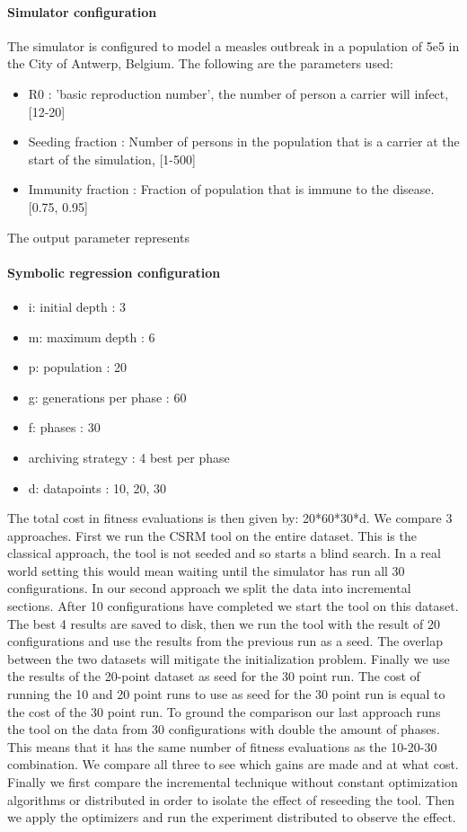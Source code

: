 \paragraph{Simulator configuration}
The simulator is configured to model a measles outbreak in a population of 5e5 in the City of Antwerp, Belgium. %
The following are the parameters used:
\begin{itemize}
\item R0 : 'basic reproduction number', the number of person a carrier will infect, [12-20]
\item Seeding fraction : Number of persons in the population that is a carrier at the start of the simulation, [1-500]
\item Immunity fraction : Fraction of population that is immune to the disease. [0.75, 0.95]
\end{itemize}
The output parameter represents 
\paragraph{Symbolic regression configuration}
\begin{itemize}
\item i: initial depth : 3
\item m: maximum depth : 6
\item p: population : 20
\item g: generations per phase : 60
\item f: phases : 30
\item archiving strategy : 4 best per phase
\item d: datapoints : 10, 20, 30
\end{itemize}
The total cost in fitness evaluations is then given by: 20*60*30*d.
We compare 3 approaches. First we run the CSRM tool on the entire dataset. This is the classical approach, the tool is not seeded and so starts a blind search. In a real world setting this would mean waiting until the simulator has run all 30 configurations.
In our second approach we split the data into incremental sections. After 10 configurations have completed we start the tool on this dataset. 
The best 4 results are saved to disk, then we run the tool with the result of 20 configurations and use the results from the previous run as a seed. The overlap between the two datasets will mitigate the initialization problem. Finally we use the results of the 20-point dataset as seed for the 30 point run. 
The cost of running the 10 and 20 point runs to use as seed for the 30 point run is equal to the cost of the 30 point run. 
To ground the comparison our last approach runs the tool on the data from 30 configurations with double the amount of phases. This means that it has the same number of fitness evaluations as the 10-20-30 combination. We compare all three to see which gains are made and at what cost.
Finally we first compare the incremental technique without constant optimization algorithms or distributed in order to isolate the effect of reseeding the tool.
Then we apply the optimizers and run the experiment distributed to observe the effect.
